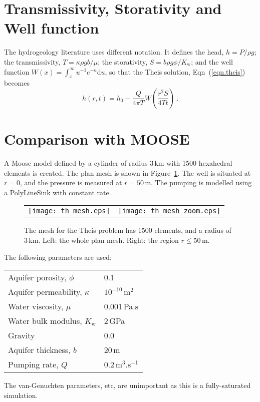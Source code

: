 \documentclass[]{scrreprt}
\begin{document}
\section{Transmissivity, Storativity and Well function}

The hydrogeology literature uses different notation.  It defines the
head, $h=P/\rho g$; the transmissivity, $T = \kappa\rho g b/\mu$; the
storativity, $S = b\rho
g \phi/K_{\mathrm{w}}$; and the well function $W(x) =
\int_{x}^{\infty}u^{-1}e^{-u}\mathrm{d}u$, so that the Theis solution,
Eqn~(\ref{eqn.theis}) becomes
\begin{equation}
h(r,t) = h_{0} - \frac{Q}{4\pi T} W
\left(\frac{r^{2}S}{4Tt} \right) \ .
\end{equation}

\section{Comparison with MOOSE}

A Moose model defined by a cylinder of radius 3\,km with 1500
hexahedral elements is created.  The plan mesh is shown in
Figure~\ref{th.mesh.fig}.  The well is situated at $r=0$, and the
pressure is measured at $r=50$\,m.  The pumping is modelled using a
PolyLineSink with constant rate.

\begin{figure}[htb]
\begin{center}
\begin{tabular}{cc}
\texttt{[image: th\_mesh.eps]} &
\texttt{[image: th\_mesh\_zoom.eps]}
\end{tabular}
\caption{The mesh for the Theis problem has 1500 elements, and a
  radius of 3\,km.  Left: the whole plan mesh.  Right: the region
  $r\leq 50$\,m.}
\label{th.mesh.fig}
\end{center}
\end{figure}

The following parameters are used:
\begin{center}
\begin{tabular}{|ll|}
\hline
Aquifer porosity, $\phi$ & 0.1 \\
Aquifer permeability, $\kappa$ & $10^{-10}$\,m$^{2}$ \\
\hline
Water viscosity, $\mu$ & 0.001\,Pa.s \\
Water bulk modulus, $K_{\mathrm{w}}$ & 2\,GPa \\
\hline
Gravity & 0.0 \\
Aquifer thickness, $b$ & 20\,m  \\
Pumping rate, $Q$ & 0.2\,m$^{3}$.s$^{-1}$ \\
\hline
\end{tabular}
\end{center}
The van-Genuchten parameters, etc, are unimportant as this is a
fully-saturated simulation.
\end{document}

